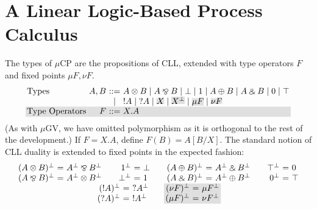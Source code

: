 \documentclass[orivec,envcountsame]{llncs}
\makeatletter
\newcommand{\with}{\mathbin\binampersand}
\newcommand{\parr}{\mathbin\bindnasrepma}
\newcommand{\cpdual}[1]{#1^\perp}
\newcommand{\cpbang}[1]{{! #1}}
\newcommand{\cpquery}[1]{{? #1}}
\newcommand{\mucp}{$\mu\mathrm{CP}$\xspace}
\newcommand{\mugv}{$\mu\mathrm{GV}$\xspace}
\newcommand{\ba}{\begin{array}}
\newcommand{\ea}{\end{array}}
\newenvironment{eqs}{\ba{@{}r@{~}c@{~}l@{}}}{\ea}
\newcommand\shade[1]{\setlength{\fboxsep}{0pt}\colorbox{shade}{\ensuremath{#1}}}
\newcommand\shaderow{\noalign{\vskip-0.4pt}\rowcolor{shade}[0.6mm]}
\makeatother
\begin{document}
\section{A Linear Logic-Based Process Calculus}\label{sec:mucp}


The types of \mucp are the propositions of CLL, extended with type operators $F$ and fixed points
$\mu F,\nu F$.
\small\[\begin{array}{@{}l@{~}r@{~}c@{~}l@{}}
  \text{Types} & A,B & ::= & A \otimes B \mid A \parr B \mid \bot \mid 1 \mid A \oplus B \mid A \with B \mid 0 \mid \top \\
   & & \mid & \cpbang{A} \mid \cpquery{A}
       \mid   \shade{X} \mid \shade{\cpdual{X}}
       \mid   \shade{\mu F} \mid \shade{\nu F} \\ \shaderow
   \text{Type Operators} & F & ::= & X.A \\
\end{array}\]\normalsize
(As with \mugv, we have omitted polymorphism as it is orthogonal to the rest of the development.)
If $F = X.A$, define $F(B) = A[B/X]$.  The standard notion of CLL duality is extended to fixed
points in the expected fashion:
\[
\ba{c}
\ba{@{}c@{\qquad}c@{\qquad}c@{\qquad}c@{}}
\begin{eqs}
  \cpdual{(A \otimes B)} &=& \cpdual{A} \parr \cpdual{B} \\
  \cpdual{(A \parr B)} &=& \cpdual{A} \otimes \cpdual{B} \\
\end{eqs}
&
\begin{eqs}
  \cpdual{1} &=& \bot \\
  \cpdual{\bot} &=& 1 \\
\end{eqs}
&
\begin{eqs}
  \cpdual{(A \oplus B)} &=& \cpdual{A} \with \cpdual{B} \\
  \cpdual{(A \with B)} &=& \cpdual{A} \oplus \cpdual{B} \\
\end{eqs}
&
\begin{eqs}
  \cpdual{\top} &=& 0 \\
  \cpdual{0} &=& \top \\
\end{eqs}
\ea
\\
\ba{@{}c@{\qquad}c@{}}
\begin{eqs}
  \cpdual{(\cpbang{A})} &=& \cpquery{\cpdual{A}} \\
  \cpdual{(\cpquery{A})} &=& \cpbang{\cpdual{A}} \\
\end{eqs}
&
\begin{eqs}
  \shaderow \cpdual{(\nu F)} &=& \mu \cpdual{F} \\
  \shaderow \cpdual{(\mu F)} &=& \nu \cpdual{F} \\
\end{eqs} \\
\ea
\ea
\]
\end{document}
